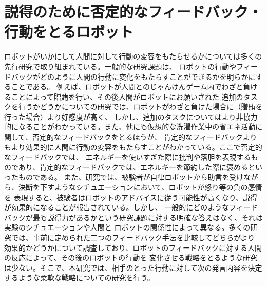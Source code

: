 \documentclass[11pt,a4j]{jreport}
\begin{document}
\section{説得のために否定的なフィードバック・行動をとるロボット}
ロボットがいかにして人間に対して行動の変容をもたらせるかについては多くの先行研究で取り組まれている。一般的な研究課題は、
ロボットの行動やフィードバックがどのように人間の行動に変化をもたらすことができるかを明らかにすることである。
例えば、ロボットが人間とのじゃんけんゲーム内でわざと負けることによって贈賄を行い、その後人間がロボットにお願いされた
追加のタスクを行うかどうかについての研究\cite{sandoval2016can}では、ロボットがわざと負けた場合に（贈賄を行った場合）より好感度が高く、
しかし、追加のタスクについてはより非協力的になることがわかっている。また、他にも仮想的な洗濯作業中の省エネ活動に関して、否定的なフィードバックをとるほうが、
肯定的なフィードバックよりもより効果的に人間に行動の変容をもたらすことがわかっている\cite{Midden2009}。ここで否定的なフィードバックでは、
エネルギーを使いすぎた際に批判や落胆を表現するものであり、肯定的なフィードバックでは、エネルギーを節約した際に褒めるといったものである。
また、研究\cite{paradeda2019makes}では、被験者が自律ロボットから助言を受けながら、決断を下すようなシチュエーションにおいて、ロボットが怒り等の負の感情を
表現すると、被験者はロボットのアドバイスに従う可能性が高くなり、説得が効果的になることが報告されている。しかし、
一般的にどのようなフィードバックが最も説得力があるかという研究課題に対する明確な答えはなく、それは実験のシチュエーションや人間と
ロボットの関係性によって異なる。多くの研究では、事前に定められた二つのフィードバック手法を比較してどちらがより
効果的かどうかについて調査しており、ロボットのフィードバックに対する人間の反応によって、その後のロボットの行動を
変化させる戦略をとるような研究は少ない。そこで、本研究では、相手のとった行動に対して次の発言内容を決定するような柔軟な戦略についての研究を行う。
\end{document}
